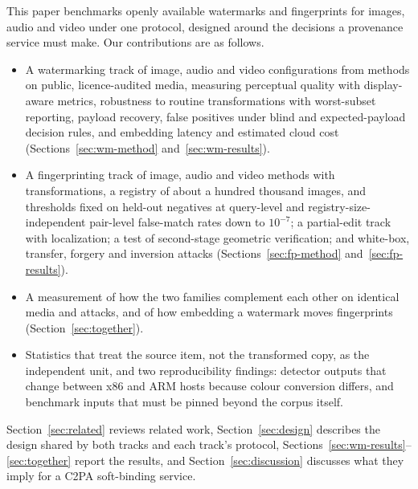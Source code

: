 This paper benchmarks openly available watermarks and fingerprints for images, audio and video under one protocol, designed around the decisions a provenance service must make. Our contributions are as follows.
\begin{itemize}
\item A watermarking track of  image,  audio and  video configurations from  methods on public, licence-audited media, measuring perceptual quality with display-aware metrics, robustness to  routine transformations with worst-subset reporting, payload recovery, false positives under blind and expected-payload decision rules, and embedding latency and estimated cloud cost (Sections~\ref{sec:wm-method} and~\ref{sec:wm-results}).
\item A fingerprinting track of  image,  audio and  video methods with  transformations, a registry of about a hundred thousand images, and thresholds fixed on held-out negatives at query-level and registry-size-independent pair-level false-match rates down to $10^{-7}$; a partial-edit track with localization; a test of second-stage geometric verification; and white-box, transfer, forgery and inversion attacks (Sections~\ref{sec:fp-method} and~\ref{sec:fp-results}).
\item A measurement of how the two families complement each other on identical media and attacks, and of how embedding a watermark moves fingerprints (Section~\ref{sec:together}).
\item Statistics that treat the source item, not the transformed copy, as the independent unit, and two reproducibility findings: detector outputs that change between x86 and ARM hosts because colour conversion differs, and benchmark inputs that must be pinned beyond the corpus itself.
\end{itemize}
Section~\ref{sec:related} reviews related work, Section~\ref{sec:design} describes the design shared by both tracks and each track's protocol, Sections~\ref{sec:wm-results}--\ref{sec:together} report the results, and Section~\ref{sec:discussion} discusses what they imply for a C2PA soft-binding service.
